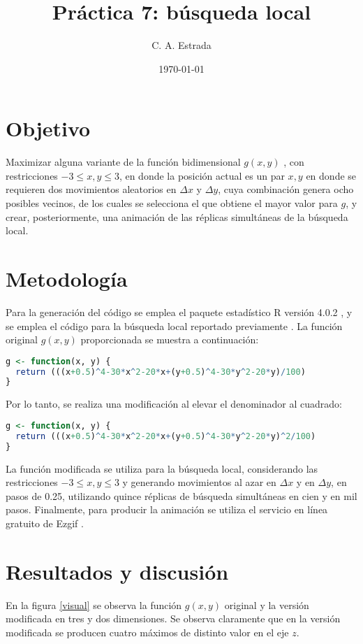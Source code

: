 \documentclass{article}
\title{\bf Práctica 7: búsqueda local}
\date{\today}
\author{C. A. Estrada}
\begin{document}
\maketitle

\section{Objetivo}
Maximizar alguna variante de la función bidimensional $g(x,y)$ \cite{dra}, con restricciones $-3\leq x,y \leq3$, en donde la posición actual es un par $x,y$ en donde se requieren dos movimientos aleatorios en $\Delta x$ y $\Delta y$, cuya combinación genera ocho posibles vecinos, de los cuales se selecciona el que obtiene el mayor valor para $g$, y crear, posteriormente, una animación de las réplicas simultáneas de la búsqueda local.

\section{Metodología}
Para la generación del código se emplea el paquete estadístico R versión 4.0.2 \cite{R}, y se emplea el código para la búsqueda local reportado previamente \cite{dra}\cite{clara}. La función original $g(x,y)$ proporcionada se muestra a continuación:
\begin{lstlisting}[language=R]
g <- function(x, y) {
  return (((x+0.5)^4-30*x^2-20*x+(y+0.5)^4-30*y^2-20*y)/100)
}
\end{lstlisting}
Por lo tanto, se realiza una modificación al elevar el denominador al cuadrado:
\begin{lstlisting}[language=R]
g <- function(x, y) {
  return (((x+0.5)^4-30*x^2-20*x+(y+0.5)^4-30*y^2-20*y)^2/100)
}
\end{lstlisting}

La función modificada se utiliza para la búsqueda local, considerando las restricciones  $-3\leq x,y \leq3$ y generando movimientos al azar en $\Delta x$ y en $\Delta y$, en pasos de 0.25, utilizando quince réplicas de búsqueda simultáneas en cien y en mil pasos. Finalmente, para producir la animación se utiliza el servicio en línea gratuito de Ezgif \cite{gif}.

\section{Resultados y discusión}
En la figura \ref{visual} se observa la función $g(x,y)$ original y la versión modificada en tres y dos dimensiones. Se observa claramente que en la versión modificada se producen cuatro máximos de distinto valor en el eje $z$. 
\end{document}
